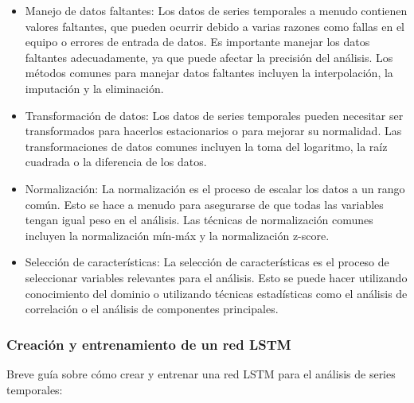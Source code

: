 \documentclass[11pt]{article}
\begin{document}
\begin{itemize}
\item Manejo de datos faltantes: Los datos de series temporales a menudo
contienen valores faltantes, que pueden ocurrir debido a varias
razones como fallas en el equipo o errores de entrada de datos. Es
importante manejar los datos faltantes adecuadamente, ya que puede
afectar la precisión del análisis. Los métodos comunes para manejar
datos faltantes incluyen la interpolación, la imputación y la
eliminación.

\item Transformación de datos: Los datos de series temporales pueden
necesitar ser transformados para hacerlos estacionarios o para
mejorar su normalidad. Las transformaciones de datos comunes
incluyen la toma del logaritmo, la raíz cuadrada o la diferencia de
los datos.

\item Normalización: La normalización es el proceso de escalar los datos a
un rango común. Esto se hace a menudo para asegurarse de que todas
las variables tengan igual peso en el análisis. Las técnicas de
normalización comunes incluyen la normalización mín-máx y la
normalización z-score.

\item Selección de características: La selección de características es el
proceso de seleccionar variables relevantes para el análisis. Esto
se puede hacer utilizando conocimiento del dominio o utilizando
técnicas estadísticas como el análisis de correlación o el análisis
de componentes principales.
\end{itemize}

\subsubsection{Creación y entrenamiento de un red LSTM}
\label{sec:org136e07c}
Breve guía sobre cómo crear y entrenar una red LSTM para el análisis
de series temporales:
\end{document}
